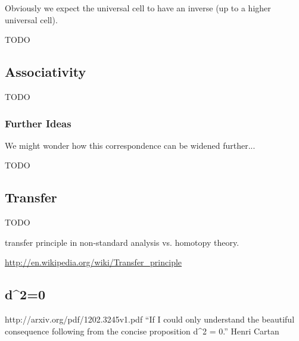 \documentclass{article}
\begin{document}
Obviously we expect the universal cell to have an inverse (up to a higher universal cell).

TODO

\subsection{Associativity}

TODO

\subsubsection{Further Ideas}

We might wonder how this correspondence can be widened further...

TODO

\subsection{Transfer}

TODO

transfer principle in non-standard analysis vs. homotopy theory.

\url{http://en.wikipedia.org/wiki/Transfer_principle}

\subsection{d^2=0}
http://arxiv.org/pdf/1202.3245v1.pdf
“If I could only understand the beautiful consequence following from the concise proposition d^2 = 0.” Henri Cartan
\end{document}
